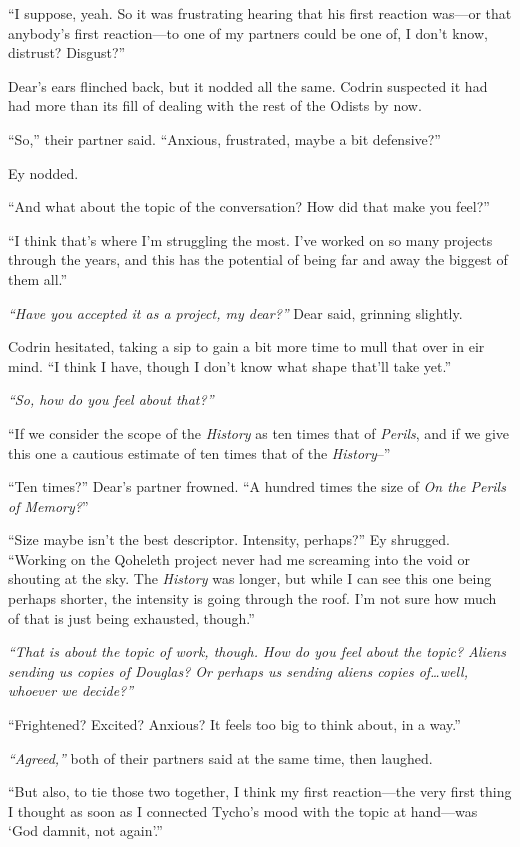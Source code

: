 ``I suppose, yeah. So it was frustrating hearing that his first reaction was—or that anybody's first reaction—to one of my partners could be one of, I don't know, distrust? Disgust?''

Dear's ears flinched back, but it nodded all the same. Codrin suspected it had had more than its fill of dealing with the rest of the Odists by now.

``So,'' their partner said. ``Anxious, frustrated, maybe a bit defensive?''

Ey nodded.

``And what about the topic of the conversation? How did that make you feel?''

``I think that's where I'm struggling the most. I've worked on so many projects through the years, and this has the potential of being far and away the biggest of them all.''

\emph{``Have you accepted it as a project, my dear?''} Dear said, grinning slightly.

Codrin hesitated, taking a sip to gain a bit more time to mull that over in eir mind. ``I think I have, though I don't know what shape that'll take yet.''

\emph{``So, how do you feel about that?''}

``If we consider the scope of the \emph{History} as ten times that of \emph{Perils}, and if we give this one a cautious estimate of ten times that of the \emph{History}--''

``Ten times?'' Dear's partner frowned. ``A hundred times the size of \emph{On the Perils of Memory?}''

``Size maybe isn't the best descriptor. Intensity, perhaps?'' Ey shrugged. ``Working on the Qoheleth project never had me screaming into the void or shouting at the sky. The \emph{History} was longer, but while I can see this one being perhaps shorter, the intensity is going through the roof. I'm not sure how much of that is just being exhausted, though.''

\emph{``That is about the topic of work, though. How do you feel about the topic? Aliens sending us copies of Douglas? Or perhaps us sending aliens copies of\ldots well, whoever we decide?''}

``Frightened? Excited? Anxious? It feels too big to think about, in a way.''

\emph{``Agreed,''} both of their partners said at the same time, then laughed.

``But also, to tie those two together, I think my first reaction—the very first thing I thought as soon as I connected Tycho's mood with the topic at hand—was `God damnit, not again'.''

